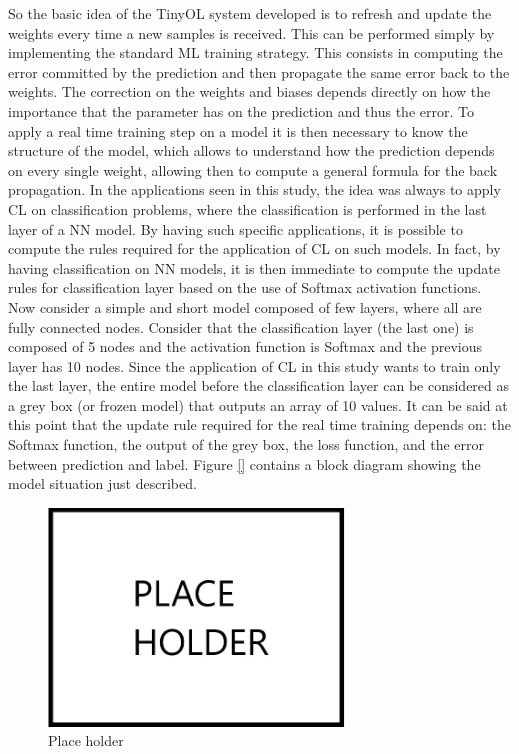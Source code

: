 \documentclass[12pt]{report}
\begin{document}
So the basic idea of the TinyOL system developed is to refresh and update the weights every time a new samples is received. This can be performed simply by implementing the standard ML training strategy. This consists in computing the error committed by the prediction and then propagate the same error back to the weights. The correction on the weights and biases depends directly on how the importance that the parameter has on the prediction and thus the error. To apply a real time training step on a model it is then necessary to know the structure of the model, which allows to understand how the prediction depends on every single weight, allowing then to compute a general formula for the back propagation. In the applications seen in this study, the idea was always to apply CL on classification problems, where the classification is performed in the last layer of a NN model. By having such specific applications, it is possible to compute the rules required for the application of CL on such models. In fact, by having classification on NN models, it is then immediate to compute the update rules for classification layer based on the use of Softmax activation functions.\\
Now consider a simple and short model composed of few layers, where all are fully connected nodes. Consider that the classification layer (the last one) is composed of 5 nodes and the activation function is Softmax and the previous layer has 10 nodes. Since the application of CL in this study wants to train only the last layer, the entire model before the classification layer can be considered as a grey box (or frozen model) that outputs an array of 10 values. It can be said at this point that the update rule required for the real time training depends on: the Softmax function, the output of the grey box, the loss function, and the error between prediction and label. Figure \ref{} contains a block diagram showing the model situation just described. \\

\begin{figure}[h!]
    \centering
    \includegraphics[width=0.7\textwidth]{Figures/Chapter3/PLACEHOLDER.jpg} 
    \caption{Place holder}
    \label{fig:placeholder}    
\end{figure}
\end{document}
